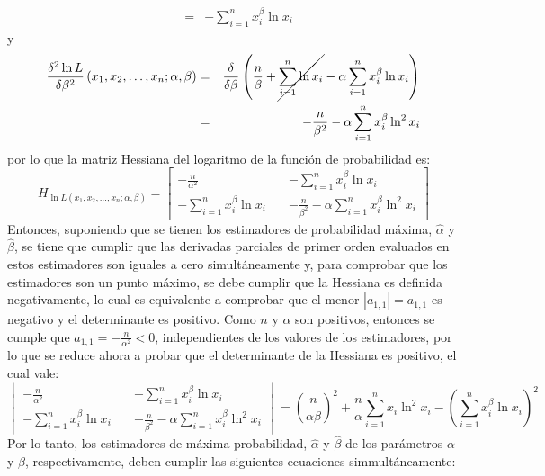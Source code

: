 \begin{solucion}
\begin{enumerate}
\begin{eqnarray*}
   & = & - \sum_{i=1}^n x_i^\beta \ln x_i
  \end{eqnarray*}
  y
  \begin{eqnarray*}
   \frac{\delta^2 \ln L}{\delta \beta^2} \left( x_1, x_2, \ldots, x_n; \alpha, \beta \right) & = & \frac{\delta}{\delta \beta} \left( \frac{n}{\beta} + \cancel{ \sum_{i=1}^{n} \ln x_i } - \alpha \sum_{i=1}^n x_i^\beta \ln x_i \right) \\ 
   & = & -\frac{n}{\beta^2} - \alpha \sum_{i=1}^n x_i^\beta \ln^2 x_i
  \end{eqnarray*}
  por lo que la matriz Hessiana del logaritmo de la funci\'on de probabilidad es:
  \begin{equation*}
   H_{\ln L(x_1,x_2, \ldots ,x_n; \alpha, \beta)} =
   \begin{bmatrix}
    \displaystyle{ - \frac{n}{\alpha^2} } & \displaystyle{ - \sum_{i=1}^n x_i^\beta \ln x_i } \\
    \displaystyle{ - \sum_{i=1}^n x_i^\beta \ln x_i } \quad & \displaystyle{ - \frac{n}{\beta^2} - \alpha \sum_{i=1}^n x_i^\beta \ln^2 x_i }
   \end{bmatrix}
  \end{equation*}
  Entonces, suponiendo que se tienen los estimadores de probabilidad m\'axima, $\hat{\alpha}$ y $\hat{\beta}$, se tiene que cumplir que las derivadas parciales de primer orden evaluados en estos estimadores son iguales a cero simult\'aneamente y, para comprobar que los estimadores son un punto m\'aximo, se debe cumplir que la Hessiana es definida negativamente, lo cual es equivalente a comprobar que el menor $|a_{1,1}| = a_{1,1}$ es negativo y el determinante es positivo. Como $n$ y $\alpha$ son positivos, entonces se cumple que $a_{1,1} = - \frac{n}{\alpha^2} < 0$, independientes de los valores de los estimadores, por lo que se reduce ahora a probar que el determinante de la Hessiana es positivo, el cual vale:
  \begin{equation*}
   \begin{vmatrix}
    \displaystyle{ - \frac{n}{\alpha^2} } & \displaystyle{ - \sum_{i=1}^n x_i^\beta \ln x_i } \\
    \displaystyle{ - \sum_{i=1}^n x_i^\beta \ln x_i } \quad & \displaystyle{ - \frac{n}{\beta^2} - \alpha \sum_{i=1}^n x_i^\beta \ln^2 x_i }
   \end{vmatrix}
   = \left( \frac{n}{\alpha \beta} \right)^2 + \frac{n}{\alpha} \sum_{i=1}^n x_i \ln^2 x_i - \left( \sum_{i=1}^n x_i^{\beta} \ln x_i \right)^2
  \end{equation*}
  Por lo tanto, los estimadores de m\'axima probabilidad, $\hat{\alpha}$ y $\hat{ \beta }$ de los par\'ametros $\alpha$ y $\beta$, respectivamente, deben cumplir las siguientes ecuaciones simmult\'aneamente:

\end{enumerate}
\end{solucion}
